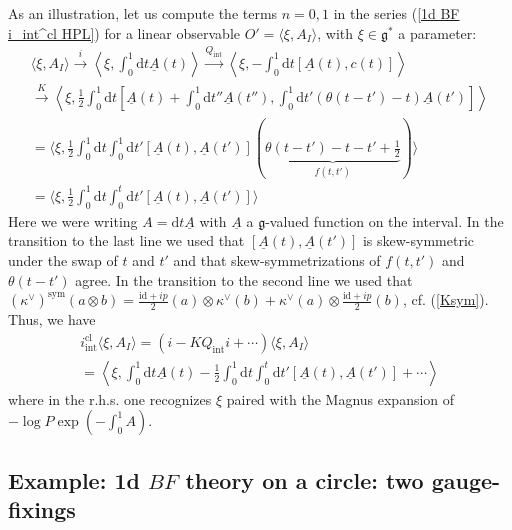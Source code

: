 \documentclass{amsart}
\theoremstyle{plain} %
\theoremstyle{definition}
\theoremstyle{remark}
\newcommand{\g}{\mathfrak{g}}
\newcommand{\mr}{\mathrm}
\newcommand{\xra}{\xrightarrow}
\newcommand{\ii}{\mathrm{int}}
\newcommand{\cl}{\mathrm{cl}}
\newcommand{\ul}{\underline}
\newcommand{\dr}{\mathrm{d}}
\begin{document}
    As an illustration, let us compute the terms $n=0,1$ in the series (\ref{1d BF i_int^cl HPL}) for a linear observable $O'=\langle \xi, A_I\rangle$, with $\xi\in \g^*$ a parameter:
    \begin{multline}
        \langle \xi, A_I \rangle \xra{i} \left\langle \xi, \int_0^1 \dr t \ul{A}(t) \right\rangle \xra{Q_\ii} \left\langle \xi,-\int_0^1 \dr t [\ul{A}(t),c(t)] \right\rangle \\
        \xra{K} 
        \left\langle \xi, \frac12 \int_0^1 \dr t \left[ \ul{A}(t)+\int_0^1 \dr t'' \ul{A}(t''), \int_0^1 \dr t' (\theta(t-t')-t)\ul{A}(t') \right] \right\rangle\\
        =\Big\langle \xi, \frac12 \int_0^1 \dr t \int_0^1 \dr t' [\ul{A}(t),\ul{A}(t')] (\underbrace{\theta(t-t')-t-t'+\frac12}_{f(t,t')}) \Big\rangle \\
        =
        \Big\langle \xi,\frac12\int_0^1 \dr t\int_0^{t} \dr t' [\ul{A}(t),\ul{A}(t')] \Big\rangle
    \end{multline}
    Here we were writing $A=\dr t \ul{A}$ with $\ul{A}$ a $\g$-valued function on the interval. In the transition to the last line we used that 
    $[\ul{A}(t),\ul{A}(t')]$ is skew-symmetric under the swap of $t$ and $t'$ and that skew-symmetrizations of $f(t,t')$ and $\theta(t-t')$ agree.
    In the transition to the second line we used that $(\kappa^\vee)^\mr{sym}(a\otimes b)=\frac{\mr{id}+ip}{2}(a)\otimes \kappa^\vee(b)+\kappa^\vee(a)\otimes \frac{\mr{id}+ip}{2}(b)$, cf. (\ref{Ksym}).  Thus, we have
    \begin{multline}
        i_\ii^\cl \langle \xi,A_I \rangle = (i-KQ_\ii i+\cdots)\langle \xi,A_I \rangle \\= \left\langle \xi,  \int_0^1 \dr t \ul{A}(t)-\frac12 \int_0^1 \dr t \int_0^t \dr t' [\ul{A}(t),\ul{A}(t')]  +\cdots\right\rangle
    \end{multline}
    where in the r.h.s. one recognizes $\xi$ paired with the Magnus expansion of $\displaystyle -\log P\exp\left(-\int_0^1 A\right)$.


\subsection{Example: 1d $BF$ theory on a circle: two gauge-fixings} %
\label{ss: 1d BF on S^1}
\end{document}
